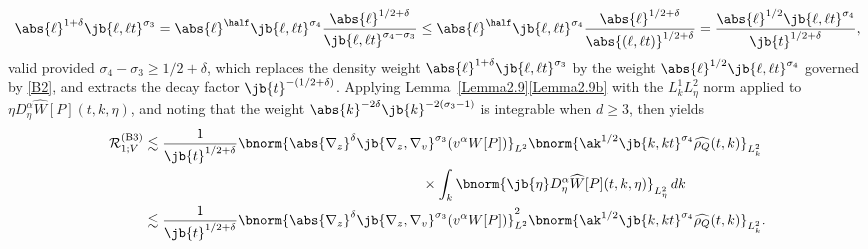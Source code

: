 \begin{align*}
\abs{\ell }^{1+\delta}\jb{\ell ,\ell t}^{\sigma_3}=\abs{\ell }^{\half}\jb{\ell ,\ell t}^{\sigma_4}\frac{\abs{\ell }^{1/2+\delta}}{\jb{\ell ,\ell t}^{\sigma_4-\sigma_3}}\leq\abs{\ell }^{\half}\jb{\ell ,\ell t}^{\sigma_4}\frac{\abs{\ell }^{1/2+\delta}}{\abs{(\ell ,\ell t)}^{1/2+\delta}}=\frac{\abs{\ell }^{1/2}\jb{\ell ,\ell t}^{\sigma_4}}{\jb{t}^{1/2+\delta}},
\end{align*}
valid provided $\sigma_4-\sigma_3\geq 1/2+\delta$, which replaces the density weight $\abs{\ell}^{1+\delta}\jb{\ell,\ell t}^{\sigma_3}$ by the weight $\abs{\ell}^{1/2}\jb{\ell,\ell t}^{\sigma_4}$ governed by \eqref{B2}, and extracts the decay factor $\jb{t}^{-(1/2+\delta)}$. Applying Lemma~\ref{Lemma2.9}\eqref{Lemma2.9b} with the $L^1_kL^2_\eta$ norm applied to $\eta D^\alpha_\eta \widehat{W}[P](t,k,\eta)$, and noting that the weight $\abs{k}^{-2\delta}\jb{k}^{-2(\sigma_3-1)}$ is integrable when $d\geq 3$, then yields
\begin{align*}
\mathcal{R}_{1;V}^{\mathrm{(B3)}}&\lesssim\frac{1}{\jb{t}^{1/2+\delta}}\bnorm{\abs{\nabla_z}^\delta\jb{\nabla_z,\nabla_v}^{\sigma_3}(v^\alpha W[P])}_{L^2}\bnorm{\ak^{1/2}\jb{k,kt}^{\sigma_4}\widehat{\rho_Q}(t,k)}_{L^2_k}\\
&\hspace{7cm}\times\int_k\bnorm{\jb{\eta}D^\alpha_\eta \widehat{W}[P](t,k,\eta)}_{L^2_\eta}\,dk\\
&\lesssim\frac{1}{\jb{t}^{1/2+\delta}}\bnorm{\abs{\nabla_z}^\delta\jb{\nabla_z,\nabla_v}^{\sigma_3}(v^\alpha W[P])}_{L^2}^2\bnorm{\ak^{1/2}\jb{k,kt}^{\sigma_4}\widehat{\rho_Q}(t,k)}_{L^2_k}.
\end{align*}

